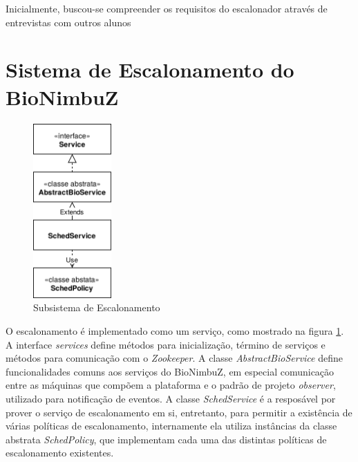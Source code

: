 
Inicialmente, buscou-se compreender os requisitos do escalonador através de entrevistas com outros alunos

\section{Sistema de Escalonamento do BioNimbuZ}

\begin{figure}[htbp]
	\centerline{\includegraphics[width=3cm]{img/SubsistemaDeEscalonamento.png}}
	\caption{Subsistema de Escalonamento}
	\label{SubsistemaDeEscalonamento}
\end{figure}


O escalonamento é implementado como um serviço, como mostrado na figura \ref{SubsistemaDeEscalonamento}. A interface \textit{services} define métodos para inicialização, término de serviços e métodos para comunicação com o \textit{Zookeeper}. A classe \textit{AbstractBioService} define funcionalidades comuns aos serviços do BioNimbuZ, em especial comunicação entre as máquinas que compõem a plataforma e o padrão de projeto \textit{observer}, utilizado para notificação de eventos. A classe \textit{SchedService} é a resposável por prover o serviço de escalonamento em si, entretanto, para permitir a existência de várias políticas de escalonamento, internamente ela utiliza instâncias da classe abstrata \textit{SchedPolicy}, que implementam cada uma das distintas políticas de escalonamento existentes.



